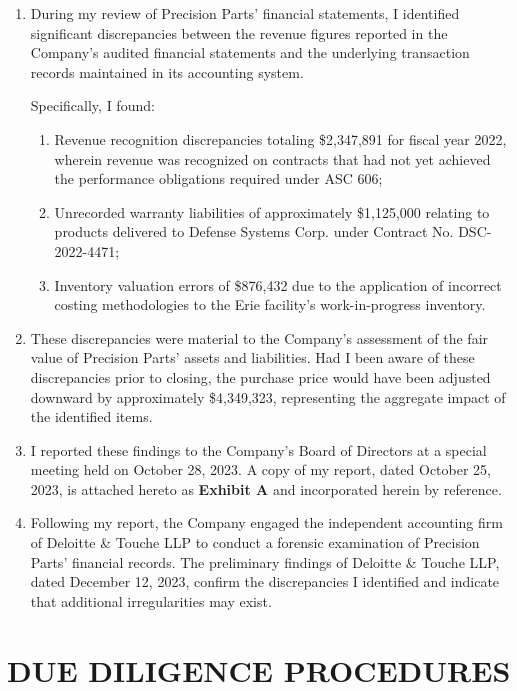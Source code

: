 \documentclass[
    language=english,
    doctype=affidavit,
    institution=none,
]{../../omnilatex}
\begin{document}
\begin{enumerate}[resume]
    \item During my review of Precision Parts' financial statements, I identified significant discrepancies between the revenue figures reported in the Company's audited financial statements and the underlying transaction records maintained in its accounting system.

    Specifically, I found:
    \begin{enumerate}[label=(\alph*)]
        \item Revenue recognition discrepancies totaling \$2,347,891 for fiscal year 2022, wherein revenue was recognized on contracts that had not yet achieved the performance obligations required under ASC 606;
        \item Unrecorded warranty liabilities of approximately \$1,125,000 relating to products delivered to Defense Systems Corp. under Contract No. DSC-2022-4471;
        \item Inventory valuation errors of \$876,432 due to the application of incorrect costing methodologies to the Erie facility's work-in-progress inventory.
    \end{enumerate}

    \item These discrepancies were material to the Company's assessment of the fair value of Precision Parts' assets and liabilities. Had I been aware of these discrepancies prior to closing, the purchase price would have been adjusted downward by approximately \$4,349,323, representing the aggregate impact of the identified items.

    \item I reported these findings to the Company's Board of Directors at a special meeting held on October 28, 2023. A copy of my report, dated October 25, 2023, is attached hereto as \textbf{Exhibit A} and incorporated herein by reference.

    \item Following my report, the Company engaged the independent accounting firm of Deloitte \& Touche LLP to conduct a forensic examination of Precision Parts' financial records. The preliminary findings of Deloitte \& Touche LLP, dated December 12, 2023, confirm the discrepancies I identified and indicate that additional irregularities may exist.
\end{enumerate}

\section{DUE DILIGENCE PROCEDURES}
\end{document}
